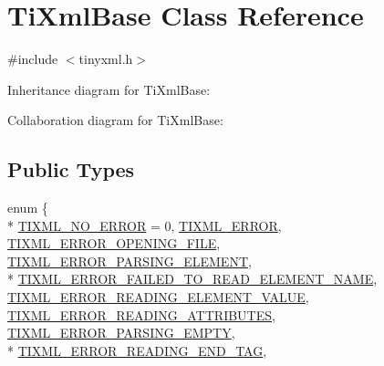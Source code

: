 \hypertarget{class_ti_xml_base}{\section{Ti\+Xml\+Base Class Reference}
\label{class_ti_xml_base}
}


{\ttfamily \#include $<$tinyxml.\+h$>$}



Inheritance diagram for Ti\+Xml\+Base\+:


Collaboration diagram for Ti\+Xml\+Base\+:
\subsection*{Public Types}
\begin{DoxyCompactItemize}
\item 
enum \{ \\*
\hyperlink{class_ti_xml_base_a6a1007a163c33d207abfbd8750c9299da750a76ca602241c416d5ec357d55fba1}{T\+I\+X\+M\+L\+\_\+\+N\+O\+\_\+\+E\+R\+R\+O\+R} = 0, 
\hyperlink{class_ti_xml_base_a6a1007a163c33d207abfbd8750c9299dabcabc1b8efabeda1cc4352aa73d64390}{T\+I\+X\+M\+L\+\_\+\+E\+R\+R\+O\+R}, 
\hyperlink{class_ti_xml_base_a6a1007a163c33d207abfbd8750c9299dab803949b8f12e03b5b57f86d9c52b614}{T\+I\+X\+M\+L\+\_\+\+E\+R\+R\+O\+R\+\_\+\+O\+P\+E\+N\+I\+N\+G\+\_\+\+F\+I\+L\+E}, 
\hyperlink{class_ti_xml_base_a6a1007a163c33d207abfbd8750c9299da5cbfcf7fe5e67f0cd1aef98deac55dd2}{T\+I\+X\+M\+L\+\_\+\+E\+R\+R\+O\+R\+\_\+\+P\+A\+R\+S\+I\+N\+G\+\_\+\+E\+L\+E\+M\+E\+N\+T}, 
\\*
\hyperlink{class_ti_xml_base_a6a1007a163c33d207abfbd8750c9299dadcc31ca78a9d507a88c9fafb3d18a3c4}{T\+I\+X\+M\+L\+\_\+\+E\+R\+R\+O\+R\+\_\+\+F\+A\+I\+L\+E\+D\+\_\+\+T\+O\+\_\+\+R\+E\+A\+D\+\_\+\+E\+L\+E\+M\+E\+N\+T\+\_\+\+N\+A\+M\+E}, 
\hyperlink{class_ti_xml_base_a6a1007a163c33d207abfbd8750c9299dafefdc75db23215e846605a2b5af0c2d3}{T\+I\+X\+M\+L\+\_\+\+E\+R\+R\+O\+R\+\_\+\+R\+E\+A\+D\+I\+N\+G\+\_\+\+E\+L\+E\+M\+E\+N\+T\+\_\+\+V\+A\+L\+U\+E}, 
\hyperlink{class_ti_xml_base_a6a1007a163c33d207abfbd8750c9299da670fac23171b64829f90639cc3696d6e}{T\+I\+X\+M\+L\+\_\+\+E\+R\+R\+O\+R\+\_\+\+R\+E\+A\+D\+I\+N\+G\+\_\+\+A\+T\+T\+R\+I\+B\+U\+T\+E\+S}, 
\hyperlink{class_ti_xml_base_a6a1007a163c33d207abfbd8750c9299da5f2aee664733a20f13f6f77556b9fa85}{T\+I\+X\+M\+L\+\_\+\+E\+R\+R\+O\+R\+\_\+\+P\+A\+R\+S\+I\+N\+G\+\_\+\+E\+M\+P\+T\+Y}, 
\\*
\hyperlink{class_ti_xml_base_a6a1007a163c33d207abfbd8750c9299da175f7c72e2f9630bb96ef5137b325502}{T\+I\+X\+M\+L\+\_\+\+E\+R\+R\+O\+R\+\_\+\+R\+E\+A\+D\+I\+N\+G\+\_\+\+E\+N\+D\+\_\+\+T\+A\+G}, 

\end{DoxyCompactItemize}
